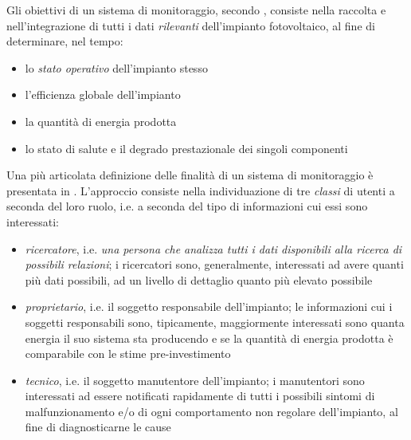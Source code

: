 %
Gli obiettivi di un sistema di monitoraggio, secondo \cite{dirks06}, consiste 
nella raccolta e nell'integrazione di tutti i dati \emph{rilevanti} dell'impianto 
fotovoltaico, al fine di determinare, nel tempo:
%
\begin{itemize}
\item lo \emph{stato operativo} dell'impianto stesso
\item l'efficienza globale dell'impianto
\item la quantit\`a di energia prodotta
\item lo stato di salute e il degrado prestazionale dei singoli componenti
\end{itemize}
%

%
Una pi\`u articolata definizione delle finalit\`a di un sistema di monitoraggio
\`e presentata in \cite{kolodenny08}. L'approccio consiste nella 
individuazione di tre \emph{classi} di utenti a seconda del loro ruolo, i.e.
a seconda del tipo di informazioni cui essi sono interessati:
%
\begin{itemize}
\item \emph{ricercatore}, i.e. \emph{una persona che analizza tutti i dati disponibili 
alla ricerca di possibili relazioni}; i ricercatori sono, generalmente, interessati 
ad avere quanti pi\`u dati possibili, ad un livello di dettaglio quanto pi\`u elevato
possibile
%
\item \emph{proprietario}, i.e. il soggetto responsabile dell'impianto; le informazioni
cui i soggetti responsabili sono, tipicamente, maggiormente interessati sono 
quanta energia il suo sistema sta producendo e  se la quantit\`a di energia 
prodotta \`e comparabile con le stime pre-investimento
%
\item \emph{tecnico}, i.e. il soggetto manutentore dell'impianto; i manutentori sono
interessati ad essere notificati rapidamente di tutti i possibili sintomi di malfunzionamento 
e/o di ogni comportamento non regolare dell'impianto, al fine di diagnosticarne le cause
\end{itemize}
%









